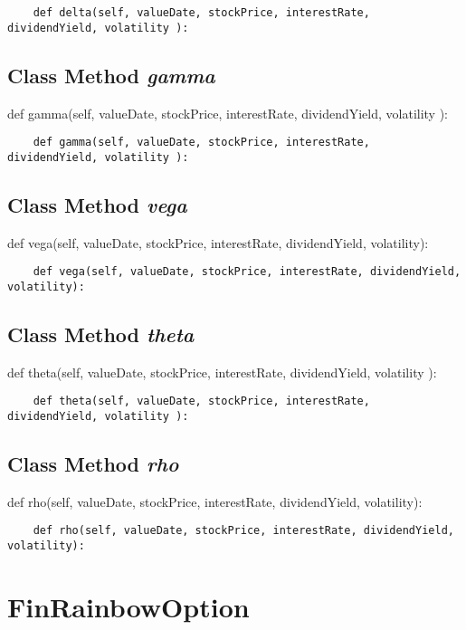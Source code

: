 \documentclass[twoside,11pt]{book}
\begin{document}
\begin{lstlisting}
    def delta(self, valueDate, stockPrice, interestRate, dividendYield, volatility ):
\end{lstlisting}

\subsection{Class Method {\it gamma}}
def gamma(self, valueDate, stockPrice, interestRate, dividendYield, volatility ):

\begin{lstlisting}
    def gamma(self, valueDate, stockPrice, interestRate, dividendYield, volatility ):
\end{lstlisting}

\subsection{Class Method {\it vega}}
def vega(self, valueDate, stockPrice, interestRate, dividendYield, volatility):

\begin{lstlisting}
    def vega(self, valueDate, stockPrice, interestRate, dividendYield, volatility):
\end{lstlisting}

\subsection{Class Method {\it theta}}
def theta(self, valueDate, stockPrice, interestRate, dividendYield, volatility ):

\begin{lstlisting}
    def theta(self, valueDate, stockPrice, interestRate, dividendYield, volatility ):
\end{lstlisting}

\subsection{Class Method {\it rho}}
def rho(self, valueDate, stockPrice, interestRate, dividendYield, volatility):

\begin{lstlisting}
    def rho(self, valueDate, stockPrice, interestRate, dividendYield, volatility):
\end{lstlisting}

\newpage
\section{FinRainbowOption}
\end{document}
